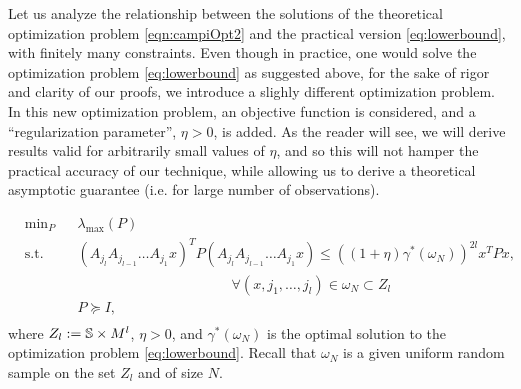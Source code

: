 Let us analyze the relationship between the solutions of the theoretical optimization problem \eqref{eqn:campiOpt2} and the practical version \eqref{eq:lowerbound}, with finitely many constraints. Even though in practice, one would solve the optimization problem  \eqref{eq:lowerbound} as suggested above, for the sake of rigor and clarity of our proofs, we introduce a slighly different optimization problem. In this new optimization problem, an objective function is considered, and a ``regularization parameter'', $\eta > 0$, is added. As the reader will see, we will derive results valid for arbitrarily small values of $\eta$, and so this will not hamper the practical accuracy of our technique, while allowing us to derive a theoretical asymptotic guarantee (i.e. for large number of observations).

\begin{equation}\label{eqn:campiOpt03}
\begin{aligned}
& \text{min}_{P} & & \lambda_{\max}(P) \\
& \text{s.t.} 
&  & (A_{j_l} A_{j_{l-1}} \dots A_{j_1} x)^T P (A_{j_l} A_{j_{l-1}} \dots A_{j_1} x) \leq {((1 +\eta)\gamma^*(\omega_N))}^{2l} x^T P x,\\
&&&\qquad \qquad \qquad \qquad \quad \qquad \forall (x, j_{1},\dots, j_{l}) \in \omega_N \subset Z_l \\
& && P \succeq I, \\
\end{aligned}
\end{equation}
where $Z_l:= \mathbb{S} \times M^l$, $\eta > 0$, and $\gamma^*(\omega_N)$ is the optimal solution to the optimization problem \eqref{eq:lowerbound}. Recall that $\omega_N$ is a given uniform random sample on the set $Z_l$ and of size $N$. 

